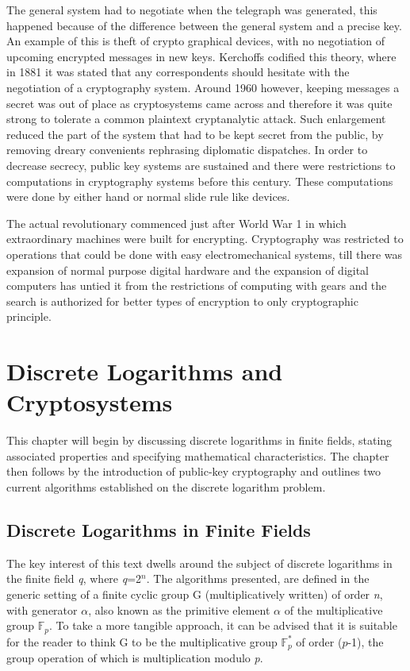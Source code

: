 \documentclass[iwp,first]{luthesis}
\begin{document}
The general system had to negotiate when the telegraph was generated, this happened because of the difference between the general system and a precise key. An example of this is theft of crypto graphical devices, with no negotiation of upcoming encrypted messages in new keys. Kerchoffs codified this theory, where in 1881 it was stated that any correspondents should hesitate with the negotiation of a cryptography system. Around 1960 however, keeping messages a secret was out of place as cryptosystems came across and therefore it was quite strong to tolerate a common plaintext cryptanalytic attack. Such enlargement reduced the part of the system that had to be kept secret from the public, by removing dreary convenients rephrasing diplomatic dispatches. In order to decrease secrecy, public key systems are sustained and there were restrictions to computations in cryptography systems before this century. These computations were done by either hand or normal slide rule like devices. 

The actual revolutionary commenced just after World War 1 in which extraordinary machines were built for encrypting. Cryptography was restricted to operations that could be done with easy electromechanical systems, till there was expansion of normal purpose digital hardware and the expansion of digital computers has untied it from the restrictions of computing with gears and the search is authorized for better types of encryption to only cryptographic principle.





\chapter{Discrete Logarithms and Cryptosystems}

This chapter will begin by discussing discrete logarithms in finite fields, stating associated properties and specifying mathematical characteristics. The chapter then follows by the introduction of public-key cryptography and outlines two current algorithms established on the discrete logarithm problem. 

\section{Discrete Logarithms in Finite Fields}

The key interest of this text dwells around the subject of discrete logarithms in the finite field \textit{q}, where \textit{q}=2$^n$. The algorithms presented, are defined in the generic setting of a finite cyclic group G (multiplicatively written) of order \textit{n}, with generator $\alpha$, also known as the primitive element $\alpha$ of the multiplicative group $\mathbb{F}_p$. To take a more tangible approach, it can be advised that it is suitable for the reader to think G to be the multiplicative group $\mathbb{F}^{*}_{p}$ of order ($p$-1), the group operation of which is multiplication modulo \textit{p}.
\end{document}
